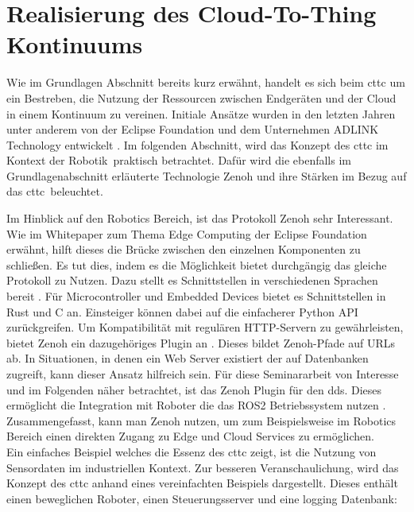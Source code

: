 \section{Realisierung des Cloud-To-Thing Kontinuums} %
\label{sec:Realisierung des Cloud-To-Thing-Continuums}

Wie im Grundlagen Abschnitt bereits kurz erwähnt, handelt es sich beim \acrlong{cttc} um ein Bestreben, die Nutzung der Ressourcen zwischen Endgeräten und der Cloud in einem Kontinuum zu vereinen. Initiale Ansätze wurden in den letzten Jahren unter anderem von der Eclipse Foundation und dem Unternehmen ADLINK Technology entwickelt \cite{cominardiDevopsEdgeopsVision2021}. Im folgenden Abschnitt, wird das Konzept des \acrlong{cttc} im Kontext der Robotik praktisch betrachtet. Dafür wird die ebenfalls im Grundlagenabschnitt erläuterte Technologie Zenoh und ihre Stärken im Bezug auf das \acrlong{cttc} beleuchtet.

Im Hinblick auf den Robotics Bereich, ist das Protokoll Zenoh sehr Interessant. Wie im Whitepaper zum Thema Edge Computing der Eclipse Foundation \cite{cominardiDevopsEdgeopsVision2021} erwähnt, hilft dieses die Brücke zwischen den einzelnen Komponenten zu schließen. Es tut dies, indem es die Möglichkeit bietet durchgängig das gleiche Protokoll zu Nutzen. Dazu stellt es Schnittstellen in verschiedenen Sprachen bereit \cite{ZenohZeroOverhead2022}. Für Microcontroller und Embedded Devices bietet es Schnittstellen in Rust und C an. Einsteiger können dabei auf die einfacherer Python API zurückgreifen. Um Kompatibilität mit regulären HTTP-Servern zu gewährleisten, bietet Zenoh ein dazugehöriges Plugin an \cite{Eclipsezenoh}. Dieses bildet Zenoh-Pfade auf URLs ab. In Situationen, in denen ein Web Server existiert der auf Datenbanken zugreift, kann dieser Ansatz hilfreich sein. Für diese Seminararbeit von Interesse und im Folgenden näher betrachtet, ist das Zenoh Plugin für den \acrlong{dds}. Dieses ermöglicht die Integration mit Roboter die das ROS2 Betriebssystem nutzen \cite{Eclipsezenoh}. Zusammengefasst, kann man Zenoh nutzen, um zum Beispielsweise im Robotics Bereich einen direkten Zugang zu Edge und Cloud Services zu ermöglichen.\\

Ein einfaches Beispiel welches die Essenz des \acrlong{cttc} zeigt, ist die Nutzung von Sensordaten im industriellen Kontext. Zur besseren Veranschaulichung, wird das Konzept des \acrlong{cttc} anhand eines vereinfachten Beispiels dargestellt. Dieses enthält einen beweglichen Roboter, einen Steuerungsserver und eine logging Datenbank:

